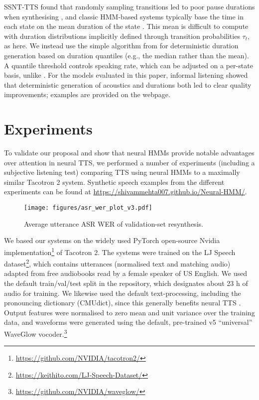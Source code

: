 \documentclass[british]{article}
\newcommand{\webpage}{https://shivammehta007.github.io/Neural-HMM/}
\begin{document}
SSNT-TTS found that randomly sampling transitions led to poor pause durations when synthesising \cite{yasuda2019initial}, and classic HMM-based systems typically base the time in each state on the mean duration of the state \cite{zen2004hidden}.
This mean is difficult to compute with duration distributions implicitly defined through transition probabilities $\tau_t$, as here.
We instead use the simple algorithm from \cite{ronanki2016median,henter2017nonparametric} for deterministic duration generation based on duration quantiles (e.g., the median rather than the mean).
A quantile threshold controls speaking rate, which can be adjusted on a per-state basis, unlike \cite{bae2020speaking}.
For the models evaluated in this paper, informal listening showed that deterministic generation of acoustics and durations both led to clear quality improvements; examples are provided on the webpage.




\section{Experiments}
\label{sec:experiments}
To validate our proposal and show
that neural HMMs provide notable advantages over attention in neural TTS,
we performed a number of experiments (including a subjective listening test) comparing TTS using neural HMMs to a maximally similar Tacotron 2 \cite{shen2018natural} system.
Synthetic speech examples from the different experiments can be found at \href{\webpage}{\webpage}.
\begin{figure}[!t]
  \centering
  \texttt{[image: figures/asr\_wer\_plot\_v3.pdf]}\caption{Average utterance ASR WER of validation-set resynthesis.}
  \label{fig:wer}
  \vspace{-1\baselineskip}
\end{figure}

We based our systems on the widely used PyTorch
open-source Nvidia  implementation\footnote{\href{https://github.com/NVIDIA/tacotron2/}{https://github.com/NVIDIA/tacotron2/}} of Tacotron 2.
The systems were trained on the LJ Speech dataset\footnote{\href{https://keithito.com/LJ-Speech-Dataset/}{https://keithito.com/LJ-Speech-Dataset/}}, which contains utterances (normalised text and matching audio) adapted from free audiobooks read by a female speaker of US English.
We used the default train/val/test split in the repository, which designates
about 23 h of audio for training.
We likewise used the default text-processing, including the pronouncing dictionary (CMUdict), since this generally benefits neural TTS \cite{fong2019comparison}.
Output features were normalised to zero mean and unit variance over the training data, and waveforms were generated using the default, pre-trained v5 ``universal'' WaveGlow \cite{prenger2019waveglow} vocoder.\footnote{\href{https://github.com/NVIDIA/waveglow/}{https://github.com/NVIDIA/waveglow/}}
\end{document}
